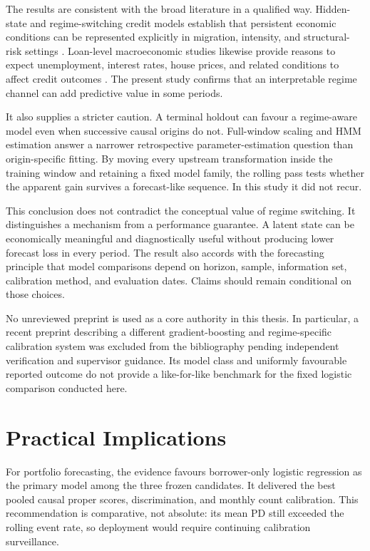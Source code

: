 The results are consistent with the broad literature in a qualified way. Hidden-state and regime-switching credit models establish that persistent economic conditions can be represented explicitly in migration, intensity, and structural-risk settings \citep{bangia_et_al_2002,yu2018modeling,milidonis_chisholm_2024}. Loan-level macroeconomic studies likewise provide reasons to expect unemployment, interest rates, house prices, and related conditions to affect credit outcomes \citep{bellotti2009credit,bellotti2013stress}. The present study confirms that an interpretable regime channel can add predictive value in some periods.

It also supplies a stricter caution. A terminal holdout can favour a regime-aware model even when successive causal origins do not. Full-window scaling and HMM estimation answer a narrower retrospective parameter-estimation question than origin-specific fitting. By moving every upstream transformation inside the training window and retaining a fixed model family, the rolling pass tests whether the apparent gain survives a forecast-like sequence. In this study it did not recur.

This conclusion does not contradict the conceptual value of regime switching. It distinguishes a mechanism from a performance guarantee. A latent state can be economically meaningful and diagnostically useful without producing lower forecast loss in every period. The result also accords with the forecasting principle that model comparisons depend on horizon, sample, information set, calibration method, and evaluation dates. Claims should remain conditional on those choices.

No unreviewed preprint is used as a core authority in this thesis. In particular, a recent preprint describing a different gradient-boosting and regime-specific calibration system was excluded from the bibliography pending independent verification and supervisor guidance. Its model class and uniformly favourable reported outcome do not provide a like-for-like benchmark for the fixed logistic comparison conducted here.

\section{Practical Implications}

For portfolio forecasting, the evidence favours borrower-only logistic regression as the primary model among the three frozen candidates. It delivered the best pooled causal proper scores, discrimination, and monthly count calibration. This recommendation is comparative, not absolute: its mean PD still exceeded the rolling event rate, so deployment would require continuing calibration surveillance.

